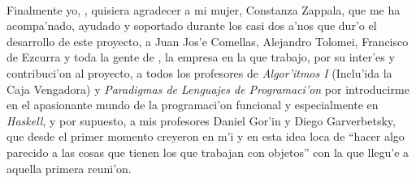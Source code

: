 \documentclass[a4paper]{article}
\newcommand{\haskell}{\textsl{Haskell}}
\begin{document}
\paragraph{}Finalmente yo, , quisiera agradecer a mi mujer, Constanza Zappala, que me ha acompa'nado, ayudado y soportado durante los casi dos a'nos que dur'o el desarrollo de este proyecto, a Juan Jos'e Comellas, Alejandro Tolomei, Francisco de Ezcurra y toda la gente de , la empresa en la que trabajo, por su inter'es y contribuci'on al proyecto, a todos los profesores de \textsl{Algor'itmos I} (Inclu'ida la Caja Vengadora) y \textsl{Paradigmas de Lenguajes de Programaci'on} por introducirme en el apasionante mundo de la programaci'on funcional y especialmente en \haskell, y por supuesto, a mis profesores Daniel Gor'in y Diego Garverbetsky, que desde el primer momento creyeron en m'i y en esta idea loca de ``hacer algo parecido a las cosas que tienen los que trabajan con objetos'' con la que llegu'e a aquella primera reuni'on.
\newpage

\end{document}
